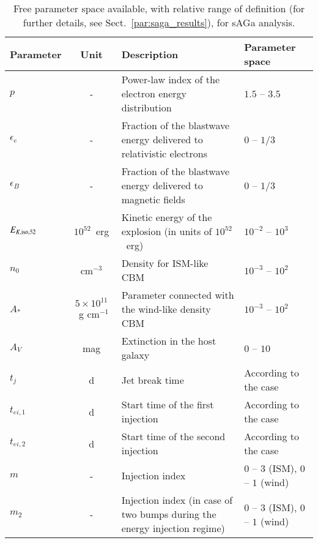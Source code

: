 \documentclass{aa}
\begin{document}
\begin{table*}
\caption{Free parameter space available, with relative range of definition (for further details, see Sect.~\ref{par:saga_results}), for {\sc sAGa} analysis.}
\label{tab:parameter_saga}
\small
\begin{tabular}{l | cl | l}
\hline
\hline
Parameter & Unit & Description & Parameter space \\
\hline
$p$                  & -                              & Power-law index of the electron energy distribution                       & $1.5$ -- $3.5$                      \\
$\epsilon_e$         & -                              & Fraction of the blastwave energy delivered to relativistic electrons      & $0$ -- $1/3$                        \\
$\epsilon_B$         & -                              & Fraction of the blastwave energy delivered to magnetic fields             & $0$ -- $1/3$                        \\
$E_{K,{\rm iso},52}$ & $10^{52}$~erg                  & Kinetic energy of the explosion (in units of $10^{52}$~erg)               & $10^{-2}$ -- $10^3$                 \\
$n_0$                & cm$^{-3}$                      & Density for ISM-like CBM                                                  & $10^{-3}$ -- $10^2$                 \\
$A_*$                & $5 \times 10^{11}$~g cm$^{-1}$ & Parameter connected with the wind-like density CBM                        & $10^{-3}$ -- $10^2$                 \\
$A_V$                & mag                            & Extinction in the host galaxy                                             & $0$ -- $10$                         \\
$t_j$                & d                              & Jet break time                                                            & According to the case               \\
$t_{ei,1}$           & d                              & Start time of the first injection                                     & According to the case               \\
$t_{ei,2}$           & d                              & Start time of the second injection                                    & According to the case               \\
$m$                  & -                              & Injection index                                                           & $0$ -- $3$ (ISM), $0$ -- $1$ (wind) \\
$m_2$                & -                              & Injection index (in case of two bumps during the energy injection regime) & $0$ -- $3$ (ISM), $0$ -- $1$ (wind) \\
\hline
\end{tabular}
\end{table*}
\end{document}
